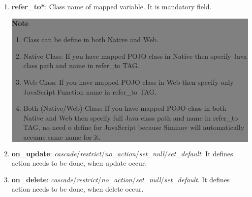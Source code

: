 \begin{enumerate}
\begin{enumerate}
			\item \small \textbf{refer\_to*}: Class name of mapped variable. It is mandatory field.

			\begin{center}
				\colorbox{grey}{
					\parbox[t]{.8\linewidth}{
						\fontsize{11pt}{11pt}\selectfont %
						\vspace*{0.1cm} %
		
						\hfill \textbf{Note} \\
			
						\hfill 	
						\begin{enumerate}

							\item \small Class can be define in both Native and Web.

							\item \small Native Class: If you have mapped POJO class in Native then specify Java class path and name in refer\_to TAG.

							\item \small Web Class: If you have mapped POJO class in Web then specify only JavaScript Function name in refer\_to TAG.

							\item \small Both (Native/Web) Class: If you have mapped POJO class in both Native and Web then specify full Java class path and name in refer\_to TAG, no need o define for JavaScript because Siminov will automatically accume same name for it.	

						\end{enumerate}

						\vspace*{0.0cm} %
				}
			}

		\end{center}



			\item \small \textbf{on\_update}: \textit{cascade}/\textit{restrict}/\textit{no\_action}/\textit{set\_null}/\textit{set\_default}. It defines action needs to be done, when update occur.

			\item \small \textbf{on\_delete}: \textit{cascade}/\textit{restrict}/\textit{no\_action}/\textit{set\_null}/\textit{set\_default}. It defines action needs to be done, when delete occur.
		

\end{enumerate}
\end{enumerate}
